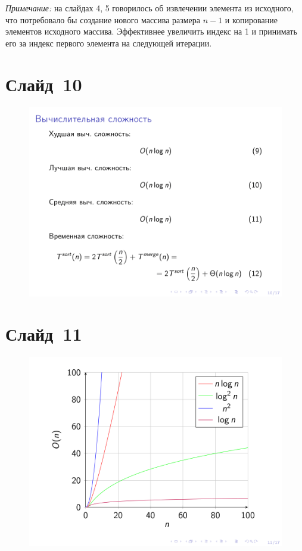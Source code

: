 \documentclass[aps,pre,reprint]{revtex4-2}
\begin{document}
	\textit{Примечание:} на слайдах 4, 5 говорилось об извлечении элемента из исходного, что потребовало бы создание нового массива размера $n - 1$ и копирование элементов исходного массива. Эффективнее увеличить индекс на 1 и принимать его за индекс первого элемента на следующей итерации.
	
	\section{Слайд~10}
	\begin{figure}[H]
		\includegraphics[scale=.7]{presentation-10.png}
	\end{figure}
	
	\section{Слайд~11}
	\begin{figure}[H]
		\includegraphics[scale=.7]{presentation-11.png}
	\end{figure}
	
\end{document}

